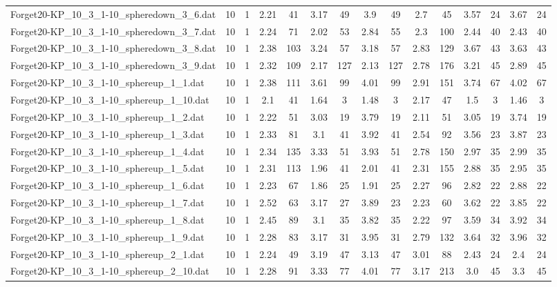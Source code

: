 \begin{table}[!ht]
{\begin{tabular}{lcccccccccccccc}
Forget20-KP\_10\_3\_1-10\_spheredown\_3\_6.dat & 10 & 1 & 2.21 & 41 & 3.17 & 49 & 3.9 & 49 & 2.7 & 45 & 3.57 & 24 & 3.67 & 24 \\
Forget20-KP\_10\_3\_1-10\_spheredown\_3\_7.dat & 10 & 1 & 2.24 & 71 & 2.02 & 53 & 2.84 & 55 & 2.3 & 100 & 2.44 & 40 & 2.43 & 40 \\
Forget20-KP\_10\_3\_1-10\_spheredown\_3\_8.dat & 10 & 1 & 2.38 & 103 & 3.24 & 57 & 3.18 & 57 & 2.83 & 129 & 3.67 & 43 & 3.63 & 43 \\
Forget20-KP\_10\_3\_1-10\_spheredown\_3\_9.dat & 10 & 1 & 2.32 & 109 & 2.17 & 127 & 2.13 & 127 & 2.78 & 176 & 3.21 & 45 & 2.89 & 45 \\
Forget20-KP\_10\_3\_1-10\_sphereup\_1\_1.dat & 10 & 1 & 2.38 & 111 & 3.61 & 99 & 4.01 & 99 & 2.91 & 151 & 3.74 & 67 & 4.02 & 67 \\
Forget20-KP\_10\_3\_1-10\_sphereup\_1\_10.dat & 10 & 1 & 2.1 & 41 & 1.64 & 3 & 1.48 & 3 & 2.17 & 47 & 1.5 & 3 & 1.46 & 3 \\
Forget20-KP\_10\_3\_1-10\_sphereup\_1\_2.dat & 10 & 1 & 2.22 & 51 & 3.03 & 19 & 3.79 & 19 & 2.11 & 51 & 3.05 & 19 & 3.74 & 19 \\
Forget20-KP\_10\_3\_1-10\_sphereup\_1\_3.dat & 10 & 1 & 2.33 & 81 & 3.1 & 41 & 3.92 & 41 & 2.54 & 92 & 3.56 & 23 & 3.87 & 23 \\
Forget20-KP\_10\_3\_1-10\_sphereup\_1\_4.dat & 10 & 1 & 2.34 & 135 & 3.33 & 51 & 3.93 & 51 & 2.78 & 150 & 2.97 & 35 & 2.99 & 35 \\
Forget20-KP\_10\_3\_1-10\_sphereup\_1\_5.dat & 10 & 1 & 2.31 & 113 & 1.96 & 41 & 2.01 & 41 & 2.31 & 155 & 2.88 & 35 & 2.95 & 35 \\
Forget20-KP\_10\_3\_1-10\_sphereup\_1\_6.dat & 10 & 1 & 2.23 & 67 & 1.86 & 25 & 1.91 & 25 & 2.27 & 96 & 2.82 & 22 & 2.88 & 22 \\
Forget20-KP\_10\_3\_1-10\_sphereup\_1\_7.dat & 10 & 1 & 2.52 & 63 & 3.17 & 27 & 3.89 & 23 & 2.23 & 60 & 3.62 & 22 & 3.85 & 22 \\
Forget20-KP\_10\_3\_1-10\_sphereup\_1\_8.dat & 10 & 1 & 2.45 & 89 & 3.1 & 35 & 3.82 & 35 & 2.22 & 97 & 3.59 & 34 & 3.92 & 34 \\
Forget20-KP\_10\_3\_1-10\_sphereup\_1\_9.dat & 10 & 1 & 2.28 & 83 & 3.17 & 31 & 3.95 & 31 & 2.79 & 132 & 3.64 & 32 & 3.96 & 32 \\
Forget20-KP\_10\_3\_1-10\_sphereup\_2\_1.dat & 10 & 1 & 2.24 & 49 & 3.19 & 47 & 3.13 & 47 & 3.01 & 88 & 2.43 & 24 & 2.4 & 24 \\
Forget20-KP\_10\_3\_1-10\_sphereup\_2\_10.dat & 10 & 1 & 2.28 & 91 & 3.33 & 77 & 4.01 & 77 & 3.17 & 213 & 3.0 & 45 & 3.3 & 45 \\

\end{tabular}}
\end{table}

